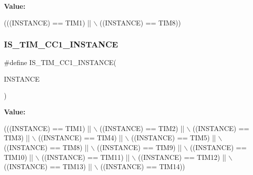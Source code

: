 {\bfseries Value\+:}
\begin{DoxyCode}
(((INSTANCE) == TIM1) || \(\backslash\)
                                          ((INSTANCE) == TIM8))
\end{DoxyCode}
\mbox{\label{group___exported__macros_ga0c02efc77b1bfb640d7f6593f58ad464}} 
\subsubsection{\texorpdfstring{I\+S\+\_\+\+T\+I\+M\+\_\+\+C\+C1\+\_\+\+I\+N\+S\+T\+A\+N\+CE}{IS\_TIM\_CC1\_INSTANCE}}
{\footnotesize\ttfamily \#define I\+S\+\_\+\+T\+I\+M\+\_\+\+C\+C1\+\_\+\+I\+N\+S\+T\+A\+N\+CE(\begin{DoxyParamCaption}\item[{}]{I\+N\+S\+T\+A\+N\+CE }\end{DoxyParamCaption})}

{\bfseries Value\+:}
\begin{DoxyCode}
(((INSTANCE) == TIM1)  || \(\backslash\)
                                         ((INSTANCE) == TIM2)  || \(\backslash\)
                                         ((INSTANCE) == TIM3)  || \(\backslash\)
                                         ((INSTANCE) == TIM4)  || \(\backslash\)
                                         ((INSTANCE) == TIM5)  || \(\backslash\)
                                         ((INSTANCE) == TIM8)  || \(\backslash\)
                                         ((INSTANCE) == TIM9)  || \(\backslash\)
                                         ((INSTANCE) == TIM10) || \(\backslash\)
                                         ((INSTANCE) == TIM11) || \(\backslash\)
                                         ((INSTANCE) == TIM12) || \(\backslash\)
                                         ((INSTANCE) == TIM13) || \(\backslash\)
                                         ((INSTANCE) == TIM14))
\end{DoxyCode}
\mbox{\label{group___exported__macros_ga6ef84d278cf917c7e420b94687b39c7c}} 
